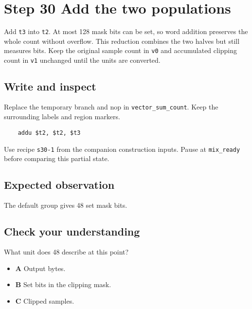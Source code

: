 \section{Step 30 Add the two populations}\label{pcm-s30}

Add \texttt{t3} into \texttt{t2}. At most 128 mask bits can be set, so word addition preserves the whole count without overflow. This reduction combines the two halves but still measures bits. Keep the original sample count in \texttt{v0} and accumulated clipping count in \texttt{v1} unchanged until the units are converted.

\subsection{Write and inspect}
Replace the temporary branch and nop in \texttt{vector\_sum\_count}. Keep the surrounding labels and region markers.

\begin{verbatim}
    addu $t2, $t2, $t3
\end{verbatim}
Use recipe \texttt{s30-1} from the companion construction inputs. Pause at \texttt{mix\_ready} before comparing this partial state.

\subsection{Expected observation}
The default group gives 48 set mask bits.

\subsection{Check your understanding}
What unit does 48 describe at this point?

\begin{itemize}
  \item \textbf{A} Output bytes.
  \item \textbf{B} Set bits in the clipping mask.
  \item \textbf{C} Clipped samples.
\end{itemize}
